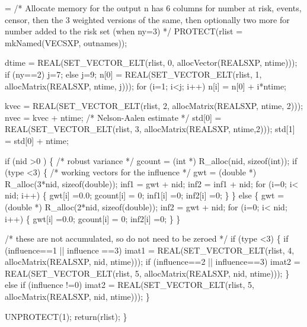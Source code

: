 \documentclass{article}
\begin{document}
\begin{nwchunk}
=
     /* Allocate memory for the output 
         n has 6 columns for number at risk, events, censor, then the 
         3 weighted versions of the same, then optionally two more for
         number added to the risk set (when ny=3)
     */
     PROTECT(rlist = mkNamed(VECSXP, outnames));
     
     dtime  = REAL(SET_VECTOR_ELT(rlist, 0, allocVector(REALSXP, ntime)));
     if (ny==2) j=7;  else j=9;
     n[0]  = REAL(SET_VECTOR_ELT(rlist, 1, allocMatrix(REALSXP, ntime, j)));
     for (i=1; i<j; i++) n[i] = n[0] + i*ntime;
 
     kvec  = REAL(SET_VECTOR_ELT(rlist, 2, allocMatrix(REALSXP, ntime, 2)));
     nvec  = kvec + ntime;  /* Nelson-Aalen estimate */
     std[0] = REAL(SET_VECTOR_ELT(rlist, 3, allocMatrix(REALSXP, ntime,2)));
     std[1] = std[0] + ntime;
   
     if (nid >0 ) \{ /* robust variance */
         gcount = (int *) R_alloc(nid, sizeof(int));
         if (type <3) \{  /* working vectors for the influence */
             gwt  = (double *) R_alloc(3*nid, sizeof(double)); 
             inf1 = gwt + nid;
             inf2 = inf1 + nid; 
             for (i=0; i< nid; i++) \{
                 gwt[i] =0.0;
                 gcount[i] = 0;
                 inf1[i] =0;
                 inf2[i] =0;
             \}
         \}
         else \{
             gwt = (double *) R_alloc(2*nid, sizeof(double));
             inf2 = gwt + nid;
             for (i=0; i< nid; i++) \{
                 gwt[i] =0.0;
                 gcount[i] = 0;
                 inf2[i] =0;
             \}
         \}
 
         /* these are not accumulated, so do not need to be zeroed */
         if (type <3) \{
             if (influence==1 || influence ==3) 
                 imat1 = REAL(SET_VECTOR_ELT(rlist, 4,
                                      allocMatrix(REALSXP, nid, ntime)));
             if (influence==2 || influence==3) 
                 imat2 =  REAL(SET_VECTOR_ELT(rlist, 5,
                            allocMatrix(REALSXP, nid, ntime))); 
         \}                
         else  if (influence !=0) 
                 imat2 = REAL(SET_VECTOR_ELT(rlist, 5,
                                allocMatrix(REALSXP, nid, ntime))); 
     \}
 
     
     UNPROTECT(1);
     return(rlist);
 \}
\end{nwchunk}
\end{document}
